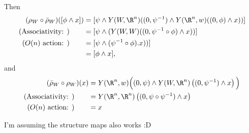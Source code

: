 \begin{exercise}[2]
\begin{enumerate}
Then 
\begin{align*}
(\rho_W \circ \bar \rho_W) ( [\phi \wedge x]) 
&= [ \psi \wedge Y(W,\R^n)((0, \psi^{-1}) \wedge Y(\R^n,w)((0,\phi) \wedge x))
]
\\
\text{(Associativity: )} \qquad
&= [ \psi \wedge ( Y(W,W)((0, \psi^{-1} \circ \phi) \wedge x)) ] \\
\text{($O(n)$ action: )} \qquad
&= [ \psi \wedge  (\psi^{-1} \circ \phi).x)) ] \\
&= [ \phi \wedge x ], \\  
\end{align*}
and
\begin{align*}
(\bar\rho_W \circ \rho_W) (x) 
&= Y(\R^n,w)\Big((0,\psi) \wedge Y(W,\R^n)\left((0, \psi^{-1}) \wedge
x\right)\Big) \\
\text{(Associativity: )} \qquad
&= Y(\R^n,\R^n)\left((0,\psi \circ \psi^{-1}) \wedge x\right) \\
\text{($O(n)$ action: )} \qquad
&= x
\end{align*}

I'm assuming the structure maps also works :D

\end{enumerate}
\end{exercise}


